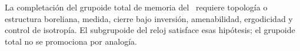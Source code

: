 \enlargethispage{6\baselineskip}
\begin{workbox}
La completación del grupoide total de memoria del \TPK\ requiere topología
o estructura boreliana, medida, cierre bajo inversión, amenabilidad,
ergodicidad y control de isotropía. El subgrupoide del reloj satisface esas
hipótesis; el grupoide total no se promociona por analogía.
\end{workbox}
